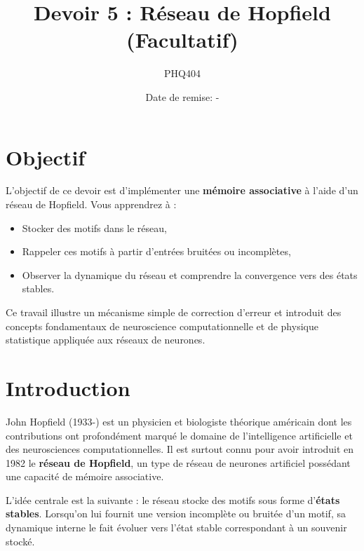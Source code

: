 \documentclass[12pt, letterpaper]{article}
\begin{document}
\title{Devoir 5 : Réseau de Hopfield (\textbf{Facultatif})}
\author{PHQ404}
\date{Date de remise: -}
\maketitle

\section{Objectif}\label{sec:objectif}

\noindent L'objectif de ce devoir est d'implémenter une \textbf{mémoire associative} à l'aide d'un réseau de Hopfield.
Vous apprendrez à :
\begin{itemize}
	\item Stocker des motifs dans le réseau,
	\item Rappeler ces motifs à partir d’entrées bruitées ou incomplètes,
	\item Observer la dynamique du réseau et comprendre la convergence vers des états stables.
\end{itemize}

\noindent Ce travail illustre un mécanisme simple de correction d'erreur et introduit des concepts fondamentaux de neuroscience computationnelle et de physique statistique appliquée aux réseaux de neurones.

\section{Introduction}\label{sec:introduction}

\noindent John Hopfield (1933-) est un physicien et biologiste théorique américain dont les contributions ont profondément marqué le domaine de l'intelligence artificielle et des neurosciences computationnelles.
Il est surtout connu pour avoir introduit en 1982 le \textbf{réseau de Hopfield}, un type de réseau de neurones artificiel possédant une capacité de mémoire associative.

\bigskip

\noindent L'idée centrale est la suivante : le réseau stocke des motifs sous forme d'\textbf{états stables}. Lorsqu'on lui fournit une version incomplète ou bruitée d’un motif, sa dynamique interne le fait évoluer vers l'état stable correspondant à un souvenir stocké.
\end{document}
